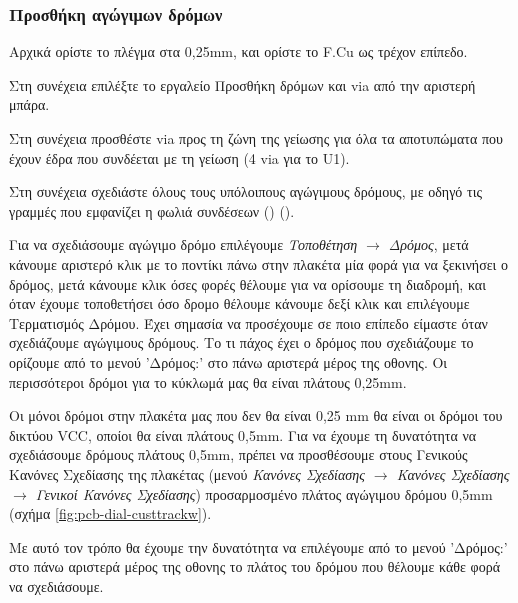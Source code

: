 \documentclass[a4paper]{article}
\begin{document}
\subsubsection{Προσθήκη αγώγιμων δρόμων}

Αρχικά ορίστε το πλέγμα στα 0,25mm, και ορίστε το F.Cu ως τρέχον επίπεδο.

Στη συνέχεια επιλέξτε το εργαλείο Προσθήκη δρόμων και via από την αριστερή μπάρα.

Στη συνέχεια προσθέστε via προς τη ζώνη της γείωσης για όλα τα αποτυπώματα που έχουν έδρα που συνδέεται με τη γείωση (4 via για το U1). 


Στη συνέχεια σχεδιάστε όλους τους υπόλοιπους αγώγιμους δρόμους, με οδηγό τις γραμμές που εμφανίζει η φωλιά συνδέσεων (\label{fig:pcb-circ-track}) (\label{fig:pcb-circ-notrack}).  

Για να σχεδιάσουμε αγώγιμο δρόμο επιλέγουμε \textit{Τοποθέτηση $\rightarrow$ Δρόμος}, μετά κάνουμε αριστερό κλικ με το ποντίκι πάνω στην πλακέτα μία φορά για να ξεκινήσει ο δρόμος, μετά κάνουμε κλικ όσες φορές θέλουμε για να ορίσουμε τη διαδρομή, και όταν έχουμε τοποθετήσει όσο δρομο θέλουμε κάνουμε δεξί κλικ και επιλέγουμε Τερματισμός Δρόμου. Έχει σημασία να προσέχουμε σε ποιο επίπεδο είμαστε όταν σχεδιάζουμε αγώγιμους δρόμους. Το τι πάχος έχει ο δρόμος που σχεδιάζουμε το ορίζουμε από το μενού 'Δρόμος:' στο πάνω αριστερά μέρος της οθονης. Οι περισσότεροι δρόμοι για το κύκλωμά μας θα είναι πλάτους 0,25mm. 

Οι μόνοι δρόμοι στην πλακέτα μας που δεν θα είναι 0,25 mm θα είναι οι δρόμοι του δικτύου VCC, οποίοι θα είναι πλάτους 0,5mm. Για να έχουμε τη δυνατότητα να σχεδιάσουμε δρόμους πλάτους 0,5mm, πρέπει να προσθέσουμε  στους Γενικούς Κανόνες Σχεδίασης της πλακέτας (μενού \textit{Κανόνες Σχεδίασης $\rightarrow$ Κανόνες Σχεδίασης $\rightarrow$ Γενικοί Κανόνες Σχεδίασης}) προσαρμοσμένο πλάτος αγώγιμου δρόμου 0,5mm (σχήμα \ref{fig:pcb-dial-custtrackw}).

Με αυτό τον τρόπο θα έχουμε την δυνατότητα να επιλέγουμε από το μενού 'Δρόμος:' στο πάνω αριστερά μέρος της οθονης το πλάτος του δρόμου που θέλουμε κάθε φορά να σχεδιάσουμε.
\end{document}
